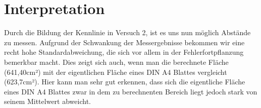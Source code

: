 \documentclass[TGAI_Laborbericht.tex]{subfiles}
\begin{document}
\section{Interpretation}
\label{chap:VERSUCH_3_INTERPRETATION}
Durch die Bildung der Kennlinie in Versuch 2, ist es uns nun möglich Abstände zu messen. Aufgrund der Schwankung der Messergebnisse bekommen wir eine recht hohe Standardabweichung, die sich vor allem in der Fehlerfortpflanzung bemerkbar macht.
Dies zeigt sich auch, wenn man die berechnete Fläche (641,40cm²) mit der eigentlichen Fläche eines DIN A4 Blattes vergleicht (623,7cm²). Hier kann man sehr gut erkennen, dass sich die eigentliche Fläche eines DIN A4 Blattes zwar in dem zu berechnenten Bereich liegt jedoch stark von seinem Mittelwert abweicht.
\end{document}

